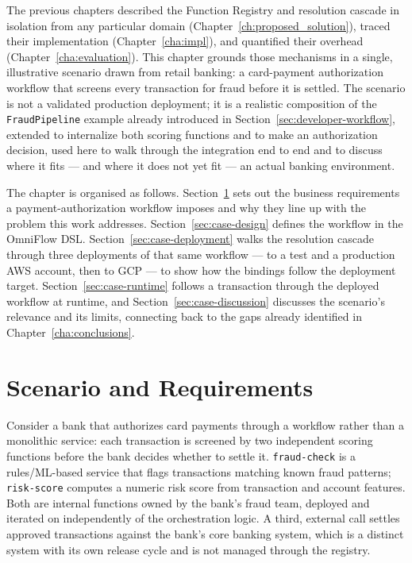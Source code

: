 The previous chapters described the Function Registry and resolution cascade in isolation from
any particular domain (Chapter~\ref{ch:proposed_solution}), traced their implementation
(Chapter~\ref{cha:impl}), and quantified their overhead (Chapter~\ref{cha:evaluation}). This
chapter grounds those mechanisms in a single, illustrative scenario drawn from retail banking:
a card-payment authorization workflow that screens every transaction for fraud before it is
settled. The scenario is not a validated production deployment; it is a realistic composition of
the \texttt{FraudPipeline} example already introduced in Section~\ref{sec:developer-workflow},
extended to internalize both scoring functions and to make an authorization decision, used here
to walk through the integration end to end and to discuss where it fits --- and where it does not
yet fit --- an actual banking environment.

The chapter is organised as follows. Section~\ref{sec:case-scenario} sets out the business
requirements a payment-authorization workflow imposes and why they line up with the problem this
work addresses. Section~\ref{sec:case-design} defines the workflow in the OmniFlow DSL.
Section~\ref{sec:case-deployment} walks the resolution cascade through three deployments of that
same workflow --- to a test and a production AWS account, then to GCP --- to show how the bindings
follow the deployment target.
Section~\ref{sec:case-runtime} follows a transaction through the deployed workflow at runtime, and
Section~\ref{sec:case-discussion} discusses the scenario's relevance and its limits, connecting
back to the gaps already identified in Chapter~\ref{cha:conclusions}.

\section{Scenario and Requirements}
\label{sec:case-scenario}

Consider a bank that authorizes card payments through a workflow rather than a monolithic
service: each transaction is screened by two independent scoring functions before the bank
decides whether to settle it. \texttt{fraud-check} is a rules/ML-based service that flags
transactions matching known fraud patterns; \texttt{risk-score} computes a numeric risk score from
transaction and account features. Both are internal functions owned by the bank's fraud team,
deployed and iterated on independently of the orchestration logic. A third, external call settles
approved transactions against the bank's core banking system, which is a distinct system with its
own release cycle and is not managed through the registry.


